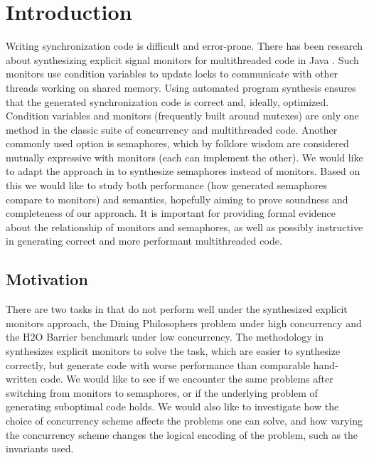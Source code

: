 \section{Introduction}

Writing synchronization code is difficult and error-prone. There has been research about synthesizing explicit signal monitors for multithreaded code in Java \cite{ferles2018}. Such monitors use condition variables to update locks to communicate with other threads working on shared memory. Using automated program synthesis ensures that the generated synchronization code is correct and, ideally, optimized.  Condition variables and monitors (frequently built around mutexes) are only one method in the classic suite of concurrency and multithreaded code. Another commonly used option is semaphores, which by folklore wisdom are considered mutually expressive with monitors (each can implement the other).  We would like to adapt the approach in \cite{ferles2018} to synthesize semaphores instead of monitors.  Based on this we would like to study both performance (how generated semaphores compare to monitors) and semantics, hopefully aiming to prove soundness and completeness of our approach.  It is important for providing formal evidence about the relationship of monitors and semaphores, as well as possibly instructive in generating correct and more performant multithreaded code.

\subsection{Motivation}
There are two tasks in \cite{ferles2018} that do not perform well under the synthesized explicit monitors approach, the Dining Philosophers problem under high concurrency and the H2O Barrier benchmark under low concurrency.  The methodology in \cite{ferles2018} synthesizes explicit monitors to solve the task, which are easier to synthesize correctly, but generate code with worse performance than comparable hand-written code.  We would like to see if we encounter the same problems after switching from monitors to semaphores, or if the underlying problem of generating suboptimal code holds.  We would also like to investigate how the choice of concurrency scheme affects the problems one can solve, and how varying the concurrency scheme changes the logical encoding of the problem, such as the invariants used. 


